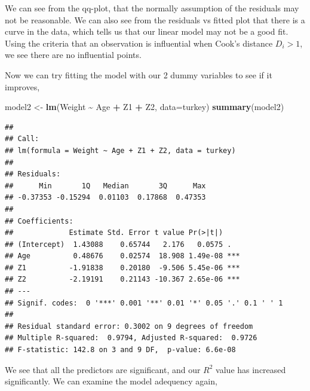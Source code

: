 \documentclass[
  11pt,
]{article}
\newenvironment{Shaded}{\begin{snugshade}}{\end{snugshade}}
\newcommand{\AttributeTok}[1]{\textcolor[rgb]{0.13,0.29,0.53}{#1}}
\newcommand{\FunctionTok}[1]{\textcolor[rgb]{0.13,0.29,0.53}{\textbf{#1}}}
\newcommand{\NormalTok}[1]{#1}
\newcommand{\OtherTok}[1]{\textcolor[rgb]{0.56,0.35,0.01}{#1}}
\newcommand{\SpecialCharTok}[1]{\textcolor[rgb]{0.81,0.36,0.00}{\textbf{#1}}}
\begin{document}
We can see from the qq-plot, that the normally assumption of the
residuals may not be reasonable. We can also see from the residuals vs
fitted plot that there is a curve in the data, which tells us that our
linear model may not be a good fit. Using the criteria that an
observation is influential when Cook's distance \(D_i > 1\), we see
there are no influential points.

Now we can try fitting the model with our 2 dummy variables to see if it
improves,

\begin{Shaded}
\begin{Highlighting}[]
\NormalTok{model2 }\OtherTok{\textless{}{-}} \FunctionTok{lm}\NormalTok{(Weight }\SpecialCharTok{\textasciitilde{}}\NormalTok{ Age }\SpecialCharTok{+}\NormalTok{ Z1 }\SpecialCharTok{+}\NormalTok{ Z2, }\AttributeTok{data=}\NormalTok{turkey)}
\FunctionTok{summary}\NormalTok{(model2)}
\end{Highlighting}
\end{Shaded}

\begin{verbatim}
## 
## Call:
## lm(formula = Weight ~ Age + Z1 + Z2, data = turkey)
## 
## Residuals:
##      Min       1Q   Median       3Q      Max 
## -0.37353 -0.15294  0.01103  0.17868  0.47353 
## 
## Coefficients:
##             Estimate Std. Error t value Pr(>|t|)    
## (Intercept)  1.43088    0.65744   2.176   0.0575 .  
## Age          0.48676    0.02574  18.908 1.49e-08 ***
## Z1          -1.91838    0.20180  -9.506 5.45e-06 ***
## Z2          -2.19191    0.21143 -10.367 2.65e-06 ***
## ---
## Signif. codes:  0 '***' 0.001 '**' 0.01 '*' 0.05 '.' 0.1 ' ' 1
## 
## Residual standard error: 0.3002 on 9 degrees of freedom
## Multiple R-squared:  0.9794, Adjusted R-squared:  0.9726 
## F-statistic: 142.8 on 3 and 9 DF,  p-value: 6.6e-08
\end{verbatim}

We see that all the predictors are significant, and our \(R^2\) value
has increased significantly. We can examine the model adequency again,
\end{document}
